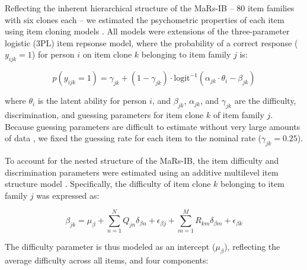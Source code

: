 \documentclass[a4paper,man,natbib]{apa6}
\begin{document}
Reflecting the inherent hierarchical structure of the MaRs-IB -- 80 item families with six clones each -- we estimated the psychometric properties of each item using item cloning models \citep{geerlings2011modeling, cho2014additive, lathrop2017item}. All models were extensions of the three-parameter logistic (3PL) item repsonse model, where the probability of a correct response ($y_{ijk} = 1$) for person $i$ on item clone $k$ belonging to item family $j$ is:

\begin{equation}
p(y_{ijk} = 1) = \gamma_{jk} + (1-\gamma_{jk}) \cdot \text{logit}^{-1} \left( \alpha_{jk} \cdot \theta_i - \beta_{jk} \right)
\end{equation}

\noindent where $\theta_i$ is the latent ability for person $i$, and $\beta_{jk}$, $\alpha_{jk}$, and $\gamma_{jk}$ are the difficulty, discrimination, and guessing parameters for item clone $k$ of item family $j$. Because guessing parameters are difficult to estimate without very large amounts of data \citep{han2012fixing}, we fixed the guessing rate for each item to the nominal rate ($\gamma_{jk} = 0.25$).

To account for the nested structure of the MaRs-IB, the item difficulty and discrimination parameters were estimated using an additive multilevel item structure model \citep{cho2014additive}. Specifically, the difficulty of item clone $k$ belonging to item family $j$ was expressed as:  

\begin{equation}
\beta_{jk} = \mu_\beta + \sum_{n=1}^N Q_{jn} \delta_{\beta n} + \epsilon_{\beta j} + \sum_{m=1}^M R_{km} \delta_{\beta m} + \epsilon_{\beta k}
\end{equation}

\noindent The difficulty parameter is thus modeled as an intercept ($\mu_\beta$), reflecting the average difficulty across all items, and four components:
\end{document}
